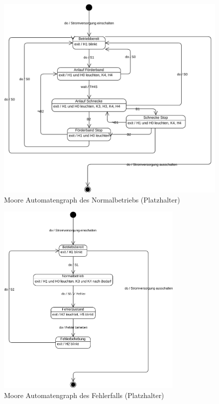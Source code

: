 \documentclass[
	pagesize,
	fontsize=12pt,
	paper=a4,
	oneside,
   reqno
]{scrartcl}
\begin{document}
\begin{figure}[H]
   \centering
   \includegraphics[width=1.0\textwidth]{Bilder/Normalbetrieb.pdf}
   \caption[Automatengraph Normalbetrieb]{Moore Automatengraph des Normalbetriebs (Platzhalter)}
   \label{fig:Bild2}
\end{figure}

\begin{figure}[H]
   \centering
   \includegraphics[width=0.8\textwidth]{Bilder/Fehlerfall.pdf}
   \caption[Automatengraph Fehlerfall]{Moore Automatengraph des Fehlerfalls (Platzhalter)}
   \label{fig:Bild3}
\end{figure}
\end{document}
